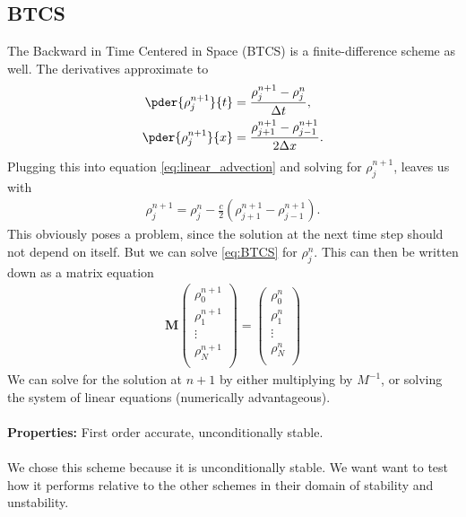 \subsection{BTCS}
The Backward in Time Centered in Space  (BTCS) is a finite-difference scheme as well. The derivatives approximate to
\begin{align}
\pder{\rho^{n+1}_j}{t}&=\frac{\rho_j^{n+1}-\rho_j^{n}}{\Delta t},\\
\pder{\rho^{n+1}_j}{x}&=\frac{\rho_{j+1}^{n+1}-\rho_{j-1}^{n+1}}{2\Delta x}.
\end{align}
Plugging this into equation \cref{eq:linear_advection} and solving for $\rho^{n+1}_j$, leaves us with
\begin{align}
\rho_j^{n+1}=\rho_j^n-\frac c2\left(\rho_{j+1}^{n+1}-\rho_{j-1}^{n+1}\right).\label{eq:BTCS}
\end{align}
This obviously poses a problem, since the solution at the next time step should not depend on itself. But we can solve  \cref{eq:BTCS} for $\rho_j^n$.
This can then be written down as a matrix equation
\begin{align}
\bm M \begin{pmatrix}
\rho^{n+1}_0\\
\rho^{n+1}_1\\
\vdots\\
\rho^{n+1}_N\\
\end{pmatrix}
=
\begin{pmatrix}
\rho^{n}_0\\
\rho^{n}_1\\
\vdots\\
\rho^{n}_N\\
\end{pmatrix}
\end{align}
We can solve for the solution at $n+1$ by either multiplying by $M^{-1}$, or solving the system of linear equations (numerically advantageous). \\ \\
\textbf{Properties:} First order accurate, unconditionally stable. \cite[p.61]{lec} \\ \\
We chose this scheme because it is unconditionally stable. We want want to test how it performs relative to the other schemes in their domain of stability and unstability. 
